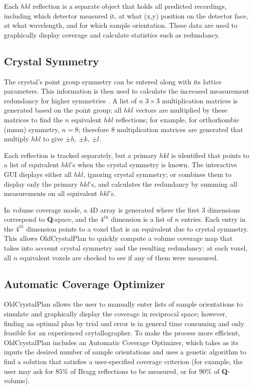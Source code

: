 \documentclass[final]{iucr}              %
\begin{document}
Each $hkl$ reflection is a separate object that holds all predicted
recordings, including which detector measured it, at what (x,y) position on the
detector face, at what wavelength, and for which sample orientation. These data
are used to graphically display coverage and calculate statistics such as
redundancy. 



\subsection{Crystal Symmetry}
\label{sec:symm}
The crystal's point group symmetry can
be entered along with its lattice parameters.
This information is then used to
calculate the increased measurement redundancy for higher symmetries
\cite{giacovazzo92}. 
A list of $n$ $3\times3$ multiplication matrices is generated based on the point group; 
all $hkl$ vectors are multiplied by
these matrices to find the $n$ equivalent $hkl$ reflections; for example, for
orthorhombic (mmm) symmetry, $n=8$; therefore 8 multiplication matrices are
generated that multiply $hkl$ to give $\pm h$, $\pm k$, $\pm l$.              

Each reflection is tracked separately, but a primary
$hkl$ is identified that points to a list of equivalent $hkl$'s when the
crystal symmetry is known.
The interactive GUI displays either all $hkl$, ignoring crystal symmetry; or
combines them to display only the primary $hkl$'s, and calculates the
redundancy by summing all measurements on all equivalent $hkl$'s.

In volume coverage mode, a 4D array is generated where the first 3 dimensions
correspond to {\bf Q}-space, and the $4^{th}$ dimension is a list of $n$
entries. Each entry in the $4^{th}$ dimension points to a voxel that is an
equivalent due to crystal symmetry. This allows OldCrystalPlan to quickly compute a volume coverage
map that takes into account crystal symmetry and the resulting redundancy: at
each voxel, all $n$ equivalent voxels are checked to see if any of them were
measured.



\subsection{Automatic Coverage Optimizer}

OldCrystalPlan allows the user to manually enter lists of sample orientations to
simulate and graphically display the coverage in reciprocal space;
however, finding an optimal plan by trial and error is in general 
time consuming and only feasible for an experienced crytallographer.
To make the process more efficient, OldCrystalPlan includes an Automatic
Coverage Optimizer, which takes as its inputs the desired number of sample
orientations and uses a genetic algorithm to find a solution that satisfies a
user-specified coverage criterion (for example, the user may ask for $85\%$ of 
Bragg reflections to be measured, or for $90\%$ of {\bf Q}-volume). 
\end{document}
